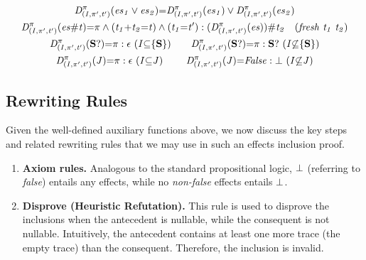 \documentclass[acmsmall,10pt,review]{acmart}
\newcommand{\es}{\textcolor{black}{\ensuremath{{es}}}}
\newcommand{\choice}{\vee}
\newcommand{\code}[1]{{\tt{\ensuremath{\m{#1}}}}}
\newcommand{\empt}{\textcolor{black}{\ensuremath{\epsilon}}}
\newcommand{\bott}{\textcolor{black}{\ensuremath{\bot}}}
\newcommand{\m}{\mathit}
\begin{document}
{\begin{definition}
\begin{gather*}
{    }
 \\
\code{D^{\pi}_{(I, \pi^\prime, t^\prime)}(  \es_1 \choice \es_2) } {=} \code{ D^{\pi}_{(I, \pi^\prime, t^\prime)}(  \es_1) \choice D^{\pi}_{(I, \pi^\prime, t^\prime)}(  \es_2)} 
\\
\code{D^{\pi}_{(I, \pi^\prime, t^\prime)}(  \es \# t) } {=}
\code{
\pi \wedge(t_1{+} t_2 {=}t) \wedge (t_1{=}t^\prime) : (D^{\pi}_{(I, \pi^\prime, t^\prime)}(\es))\# t_2} \ \ \ 
\code{(fresh \ t_1\ t_2 )}
\\
\code{D^{\pi}_{(I, \pi^\prime, t^\prime)}(\textbf{S}?)} {=} \code{\pi: \empt\ (}\code{ I {\subseteq} \{\textbf{S}\})}
\qquad
\code{D^{\pi}_{(I, \pi^\prime, t^\prime)}(\textbf{S}?)} {=} \code{\pi: \textbf{S}?\ (}\code{ I {\not\subseteq} \{\textbf{S}\})}
\\
\code{D^{\pi}_{(I, \pi^\prime, t^\prime)}(J)} {=} \code{\pi: \empt\ (}\code{ I {\subseteq} J)}
\qquad\ 
    \code{D^{\pi}_{(I, \pi^\prime, t^\prime)}( J)} {=} \code{False : \bott \ (}\code{I {\not\subseteq} J)} 
\end{gather*}
\end{definition}




\subsection{Rewriting Rules}
\label{InferenceRules}
Given the well-defined auxiliary functions above, we now discuss the key steps and related rewriting rules that we may use in such an effects inclusion proof.  


\begin{enumerate}
\item 
\textbf{Axiom rules.}
\label{Base}
Analogous to  the standard propositional logic, \code{\bott} (referring to \textit{false}) entails any effects, while no \textit{non-false} effects entails \code{\bott}.


\item 
\textbf{Disprove (Heuristic Refutation).}
\label{Refutation}
This rule is used to disprove the inclusions when the antecedent is nullable, while the consequent is not nullable. Intuitively, the antecedent contains at least one more trace (the empty trace) than the consequent. Therefore, the inclusion is invalid. 


\end{enumerate}}
\end{document}

